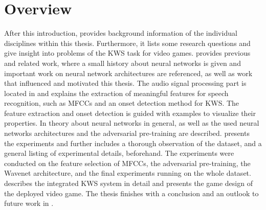 
\section{Overview}\label{sec:intro_overview}
After this introduction,  provides background information of the individual disciplines within this thesis.
Furthermore, it lists some research questions and give insight into problems of the KWS task for video games.
 provides previous and related work, where a small history about neural networks is given and important work on neural network architectures are referenced, as well as work that influenced and motivated this thesis.
The audio signal processing part is located in  and explains the extraction of meaningful features for speech recognition, such as MFCCs and an onset detection method for KWS.
The feature extraction and onset detection is guided with examples to visualize their properties.
In  theory about neural networks in general, as well as the used neural networks architectures and the adversarial pre-training are described.
 presents the experiments and further includes a thorough observation of the dataset, and a general listing of experimental details, beforehand.
The experiments were conducted on the feature selection of MFCCs, the adversarial pre-training, the Wavenet architecture, and the final experiments running on the whole dataset.
 describes the integrated KWS system in detail and presents the game design of the deployed video game.
The thesis finishes with a conclusion and an outlook to future work in .